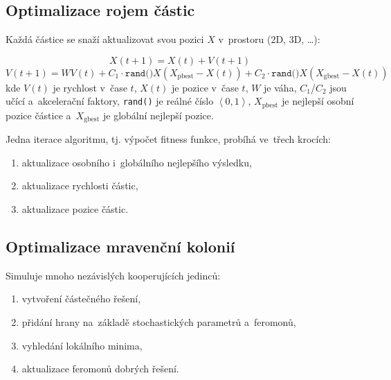 \subsection{Optimalizace rojem částic}

Každá částice se snaží aktualizovat svou pozici $X$ v~prostoru (2D, 3D, \dots):

$$X(t+1) = X(t) + V(t+1)$$
$$V(t+1) = WV(t) + C_1 \cdot \mathrm{\texttt{rand()}} X (X_\mathrm{pbest} - X(t)) + C_2 \cdot \mathrm{\texttt{rand()}} X (X_\mathrm{gbest} - X(t))$$
%
kde $V(t)$ je rychlost v~čase $t$, $X(t)$ je pozice v~čase $t$, $W$ je váha, $C_1$/$C_2$ jsou učící a~akcelerační faktory, \texttt{rand()} je reálné číslo $\left<0, 1\right>$, $X_\mathrm{pbest}$ je nejlepší osobní pozice částice a~$X_\mathrm{gbest}$ je globální nejlepší pozice.

Jedna iterace algoritmu, tj. výpočet fitness funkce, probíhá ve~třech krocích:

\begin{enumerate}
\item aktualizace osobního i~globálního nejlepšího výsledku,
\item aktualizace rychlosti částic,
\item aktualizace pozice částic.
\end{enumerate}

\subsection{Optimalizace mravenční kolonií}

Simuluje mnoho nezávislých kooperujících jedinců:

\begin{enumerate}
\item vytvoření částečného řešení,
\item přidání hrany na~základě stochastických parametrů a~feromonů,
\item vyhledání lokálního minima,
\item aktualizace feromonů dobrých řešení.
\end{enumerate}

% 

